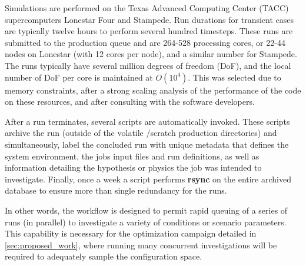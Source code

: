 Simulations are performed on the Texas Advanced Computing Center (TACC)
supercomputers Lonestar Four and Stampede. Run durations for transient
cases are typically twelve hours to perform several hundred timesteps. 
These runs are submitted to the production queue and are  
264-528 processing cores, 
or 22-44 nodes on Lonestar (with 12 cores per node), and a similar number
for Stampede. The runs typically have several million degrees of freedom (DoF), 
and the local number of DoF per core is maintained at $O(10^4)$. This was
selected due to memory constraints, after a strong scaling
analysis of the performance of the code on these resources, and
after consulting with the software developers.  

After a run terminates, several scripts are automatically invoked. 
These scripts archive the run (outside of the volatile /scratch 
production directories) and simultaneously, label the concluded run with
unique metadata that defines the system environment, the jobs input
files and run definitions, as well as information detailing the
hypothesis or physics the job was intended to investigate. Finally, once
a week a script performs \textbf{rsync} on the entire archived database to
ensure more than single redundancy for the runs. 

In other words, the workflow is designed to permit rapid queuing of a
series of runs (in parallel) to investigate a variety of conditions or
scenario parameters. This capability is necessary for the optimization
campaign detailed in \ref{sec:proposed_work}, where running many
concurrent investigations will be required to adequately sample the
configuration space.  
